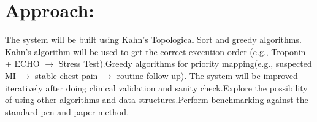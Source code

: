 \section{Approach:}
The system will be built using Kahn's Topological Sort and greedy algorithms. Kahn's algorithm will be used to get the  correct execution order (e.g., Troponin + ECHO $\rightarrow$ Stress Test).Greedy algorithms for priority mapping(e.g., suspected MI $\rightarrow$ stable chest pain $\rightarrow$ routine follow-up).
The system will be improved iteratively after doing clinical validation and sanity check.Explore the possibility of using other algorithms and data structures.Perform benchmarking against the standard pen and paper method.